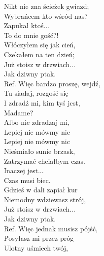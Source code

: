 
\begin{flushleft}
Nikt nie zna ścieżek gwiazd; \tab{}\\
Wybrańcem kto wśród nas? \tab{}\\
Zapukał ktoś... \tab{}\tab{}\\
To do mnie gość?! \tab{}\\
\vskip 3mm
Włóczyłem się jak cień, \tab{}\\
Czekałem na ten dzień; \tab{}\\
Już stoisz w drzwiach... \tab{}\\
Jak dziwny ptak. \tab{}\\
\vskip 3mm
Ref. Więc bardzo proszę, wejdź, \\
\hspace{0.9cm}Tu siadaj, rozgość się \tab{}\\
\hspace{0.9cm}I zdradź mi, kim tyś jest,\tab{} \\
\hspace{0.9cm}Madame?\tab{}\tab{} \\
\hspace{0.9cm}Albo nie zdradzaj mi, \tab{}\\
\hspace{0.9cm}Lepiej nie mówmy nic \tab{}\\
\hspace{0.9cm}Lepiej nie mówmy nic \tab{}\\
\vskip 3mm
Nieśmiało sunie brzask, \\
Zatrzymać chciałbym czas. \\
Inaczej jest... \\
Czas musi biec. \\
\vskip 3mm
Gdzieś w dali zapiał kur \\
Niemodny wdziewasz strój, \\
Już stoisz w drzwiach... \\
Jak dziwny ptak. \\
\vskip 3mm
Ref. Więc jednak musisz pójść,\\
\hspace{0.9cm}Posyłasz mi przez próg \\
\hspace{0.9cm}Ulotny uśmiech twój, \\

\end{flushleft}

